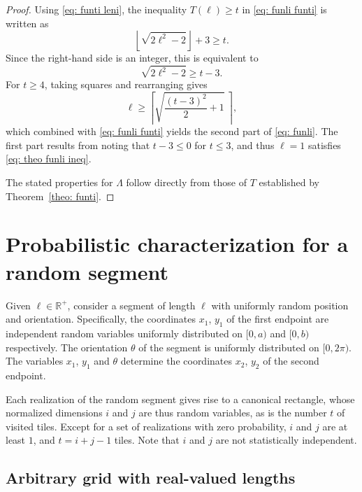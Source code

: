\documentclass[12pt, a4paper]{article}
\newcommand{\funti}{T} %
\newcommand{\funli}{\Lambda} %
\newcommand{\len}{\ell} %
\newcommand{\leni}{\ell} %
\newcommand{\tiles}{t} %
\begin{document}
\begin{proof}
Using \eqref{eq: funti leni}, the inequality $\funti(\leni) \geq \tiles$ in \eqref{eq: funli funti} is written as
\begin{equation}
\left\lfloor \sqrt{2\leni^2-2} \right\rfloor + 3 \geq \tiles.
\end{equation}
Since the right-hand side is an integer, this is equivalent to
\begin{equation}
\label{eq: theo funli ineq}
\sqrt{2\leni^2-2} \geq \tiles-3.
\end{equation}
For $\tiles \geq 4$, taking squares and rearranging gives
\begin{equation}
\leni \geq \left \lceil \sqrt{\frac{(\tiles-3)^2} 2 + 1} \ \right \rceil,
\end{equation}
which combined with \eqref{eq: funli funti} yields the second part of \eqref{eq: funli}. The first part results from noting that $\tiles-3 \leq 0$ for $\tiles \leq 3$, and thus $\leni=1$ satisfies \eqref{eq: theo funli ineq}.

The stated properties for $\funli$ follow directly from those of $\funti$ established by Theorem~\ref{theo: funti}.
\end{proof}


\section{Probabilistic characterization for a random segment}
\label{part: rand}

Given $\len \in \mathbb R^+$, consider a segment of length $\len$ with uniformly random position and orientation. Specifically, the coordinates $x_1$, $y_1$ of the first endpoint are independent random variables uniformly distributed on $[0,a)$ and $[0,b)$ respectively. The orientation $\theta$ of the segment is uniformly distributed on $[0,2\pi)$. The variables $x_1$, $y_1$ and $\theta$ determine the coordinates $x_2$, $y_2$ of the second endpoint.

Each realization of the random segment gives rise to a canonical rectangle, whose normalized dimensions $i$ and $j$ are thus random variables, as is the number $\tiles$ of visited tiles. Except for a set of realizations with zero probability, $i$ and $j$ are at least $1$, and $\tiles = i+j-1$ tiles. Note that $i$ and $j$ are not statistically independent. 


\subsection{Arbitrary grid with real-valued lengths}
\label{part: probmax: arbitrary grid, real lengths}
\end{document}
